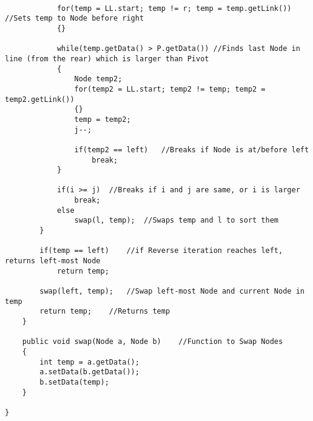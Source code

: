 \documentclass[ProgramminAssignment.tex]{subfiles}
\begin{document}
\begin{lstlisting}
			
			for(temp = LL.start; temp != r; temp = temp.getLink())	//Sets temp to Node before right
			{}
			
			while(temp.getData() > P.getData())	//Finds last Node in line (from the rear) which is larger than Pivot
			{
				Node temp2;
				for(temp2 = LL.start; temp2 != temp; temp2 = temp2.getLink())
				{}
				temp = temp2;
				j--;
				
				if(temp2 == left)	//Breaks if Node is at/before left
					break;
			}
			
			if(i >= j)	//Breaks if i and j are same, or i is larger
				break;
			else
				swap(l, temp);	//Swaps temp and l to sort them
		}
		
		if(temp == left)	//if Reverse iteration reaches left, returns left-most Node
			return temp;
		
		swap(left, temp);	//Swap left-most Node and current Node in temp
		return temp;	//Returns temp
	}	
	
	public void swap(Node a, Node b)	//Function to Swap Nodes
	{
		int temp = a.getData();
		a.setData(b.getData());
		b.setData(temp);
	}
	
}

\end{lstlisting}
\end{document}
